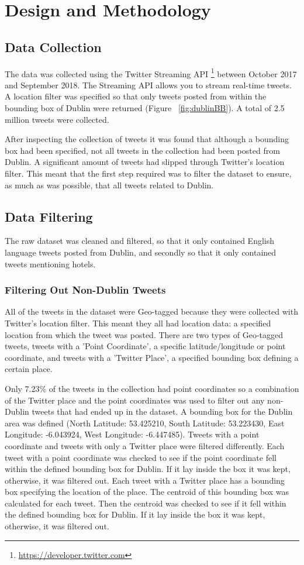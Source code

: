 \section{Design and Methodology}

\subsection{Data Collection}
The data was collected using the Twitter Streaming API \footnote{\url{https://developer.twitter.com}} between October 2017 and September 2018. The Streaming API allows you to stream real-time tweets. A location filter was specified so that only tweets posted from within the bounding box of Dublin were returned (Figure ~\ref{fig:dublinBB}). A total of 2.5 million tweets were collected.

After inspecting the collection of tweets it was found that although a bounding box had been specified, not all tweets in the collection had been posted from Dublin. A significant amount of tweets had slipped through Twitter's location filter. This meant that the first step required was to filter the dataset to ensure, as much as was possible, that all tweets related to Dublin.

\subsection{Data Filtering}
The raw dataset was cleaned and filtered, so that it only contained English language tweets posted from Dublin, and secondly so that it only contained tweets mentioning hotels.

\subsubsection{Filtering Out Non-Dublin Tweets}
All of the tweets in the dataset were Geo-tagged because they were collected with Twitter's location filter. This meant they all had location data: a specified location from which the tweet was posted. There are two types of Geo-tagged tweets, tweets with a 'Point Coordinate', a specific latitude/longitude or point coordinate, and tweets with a 'Twitter Place', a specified bounding box defining a certain place.

Only 7.23\% of the tweets in the collection had point coordinates so a combination of the Twitter place and the point coordinates was used to filter out any non-Dublin tweets that had ended up in the dataset. A bounding box for the Dublin area was defined (North Latitude: 53.425210, South Latitude: 53.223430, East Longitude: -6.043924, West Longitude: -6.447485). Tweets with a point coordinate and tweets with only a Twitter place were filtered differently. Each tweet with a point coordinate was checked to see if the point coordinate fell within the defined bounding box for Dublin. If it lay inside the box it was kept, otherwise, it was filtered out. Each tweet with a Twitter place has a bounding box specifying the location of the place. The centroid of this bounding box was calculated for each tweet. Then the centroid was checked to see if it fell within the defined bounding box for Dublin. If it lay inside the box it was kept, otherwise, it was filtered out. 

